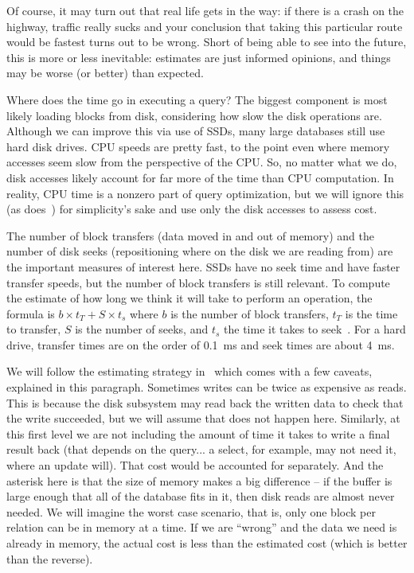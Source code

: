Of course, it may turn out that real life gets in the way: if there is a crash on the highway, traffic really sucks and your conclusion that taking this particular route would be fastest turns out to be wrong. Short of being able to see into the future, this is more or less inevitable: estimates are just informed opinions, and things may be worse (or better) than expected. 

Where does the time go in executing a query? The biggest component is most likely loading blocks from disk, considering how slow the disk operations are. Although we can improve this via use of SSDs, many large databases still use hard disk drives. CPU speeds are pretty fast, to the point even where memory accesses seem slow from the perspective of the CPU. So, no matter what we do, disk accesses likely account for far more of the time than CPU computation. In reality, CPU time is a nonzero part of query optimization, but we will ignore this (as does~\cite{dsc}) for simplicity's sake and use only the disk accesses to assess cost.

The number of block transfers (data moved in and out of memory) and the number of disk seeks (repositioning where on the disk we are reading from) are the important measures of interest here. SSDs have no seek time and have faster transfer speeds, but the number of block transfers is still relevant. To compute the estimate of how long we think it will take to perform an operation, the formula is $b \times t_{T} + S \times t_{s}$ where $b$ is the number of block transfers, $t_{T}$ is the time to transfer, $S$ is the number of seeks, and $t_{s}$ the time it takes to seek~\cite{dsc}. For a hard drive, transfer times are on the order of 0.1~ms and seek times are about 4~ms.

We will follow the estimating strategy in~\cite{dsc} which comes with a few caveats, explained in this paragraph. Sometimes writes can be twice as expensive as reads. This is because the disk subsystem may read back the written data to check that the write succeeded, but we will assume that does not happen here. Similarly, at this first level we are not including the amount of time it takes to write a final result back (that depends on the query... a select, for example, may not need it, where an update will). That cost would be accounted for separately. And the asterisk here is that the size of memory makes a big difference -- if the buffer is large enough that all of the database fits in it, then disk reads are almost never needed. We will imagine the worst case scenario, that is, only one block per relation can be in memory at a time. If we are ``wrong'' and the data we need is already in memory, the actual cost is less than the estimated cost (which is better than the reverse). 

